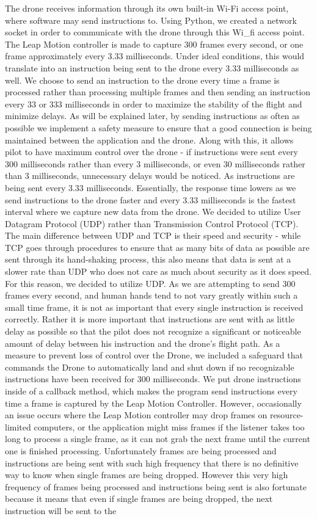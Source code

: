 \documentclass[letterpaper,english, 12pt]{article}
\begin{document}
The drone receives information through its own built-in Wi-Fi access point, where software may send instructions to. Using Python, we created a network socket in order to communicate with the drone through this Wi_fi access point. The Leap Motion controller is made to capture 300 frames every second, or one frame approximately every 3.33 milliseconds. Under ideal conditions, this would translate into an instruction being sent to the drone every 3.33 milliseconds as well. We choose to send an instruction to the drone every time a frame is processed rather than processing multiple frames and then sending an instruction every 33 or 333 milliseconds in order to maximize the stability of the flight and minimize delays. As will be explained later, by sending instructions as often as possible we implement a safety measure to ensure that a good connection is being maintained between the application and the drone. Along with this, it allows pilot to have maximum control over the drone - if instructions were sent every 300 milliseconds rather than every 3 milliseconds, or even 30 milliseconds rather than 3 milliseconds, unnecessary delays would be noticed. As instructions are being sent every 3.33 milliseconds. Essentially, the response time lowers as we send instructions to the drone faster and every 3.33 milliseconds is the fastest interval where we capture new data from the drone.  We decided to utilize User Datagram Protocol (UDP) rather than Transmission Control Protocol (TCP). The main difference between UDP and TCP is their speed and security - while TCP goes through procedures to ensure that as many bits of data as possible are sent through its hand-shaking process, this also means that data is sent at a slower rate than UDP who does not care as much about security as it does speed. For this reason, we decided to utilize UDP. As we are attempting to send 300 frames every second, and human hands tend to not vary greatly within such a small time frame, it is not as important that every single instruction is received correctly. Rather it is more important that instructions are sent with as little delay as possible so that the pilot does not recognize a significant or noticeable amount of delay between his instruction and the drone's flight path. As a measure to prevent loss of control over the Drone, we included a safeguard that commands the Drone to automatically land and shut down if no recognizable instructions have been received for 300 milliseconds. We put drone instructions inside of a callback method, which makes the program send instructions every time a frame is captured by the Leap Motion Controller. However, occasionally an issue occurs where the Leap Motion controller may drop frames on resource-limited computers, or the application might miss frames if the listener takes too long to process a single frame, as it can not grab the next frame until the current one is finished processing. Unfortunately frames are being processed and instructions are being sent with such high frequency that there is no definitive way to know when single frames are being dropped. However this very high frequency of frames being processed and instructions being sent is also fortunate because it means that even if single frames are being dropped, the next instruction will be sent to the 
\end{document}
